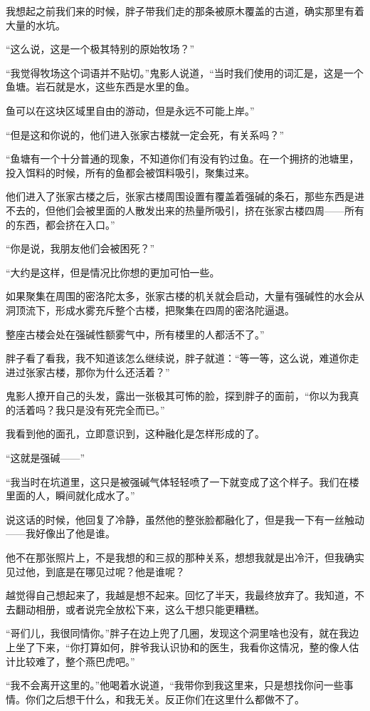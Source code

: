 我想起之前我们来的时候，胖子带我们走的那条被原木覆盖的古道，确实那里有着大量的水坑。

“这么说，这是一个极其特别的原始牧场？”

“我觉得牧场这个词语并不贴切。”鬼影人说道，“当时我们使用的词汇是，这是一个鱼塘。岩石就是水，这些东西是水里的鱼。

鱼可以在这块区域里自由的游动，但是永远不可能上岸。”

“但是这和你说的，他们进入张家古楼就一定会死，有关系吗？”

“鱼塘有一个十分普通的现象，不知道你们有没有钓过鱼。在一个拥挤的池塘里，投入饵料的时候，所有的鱼都会被饵料吸引，聚集过来。

他们进入了张家古楼之后，张家古楼周围设置有覆盖着强碱的条石，那些东西是进不去的，但他们会被里面的人散发出来的热量所吸引，挤在张家古楼四周——所有的东西，都会挤在入口。”

“你是说，我朋友他们会被困死？”

“大约是这样，但是情况比你想的更加可怕一些。

如果聚集在周围的密洛陀太多，张家古楼的机关就会启动，大量有强碱性的水会从洞顶流下，形成水雾充斥整个古楼，把聚集在四周的密洛陀逼退。

整座古楼会处在强碱性额雾气中，所有楼里的人都活不了。”

胖子看了看我，我不知道该怎么继续说，胖子就道：“等一等，这么说，难道你走进过张家古楼，那你为什么还活着？”

鬼影人撩开自己的头发，露出一张极其可怖的脸，探到胖子的面前，“你以为我真的活着吗？我只是没有死完全而已。”

我看到他的面孔，立即意识到，这种融化是怎样形成的了。

“这就是强碱——”

“我当时在坑道里，这只是被强碱气体轻轻喷了一下就变成了这个样子。我们在楼里面的人，瞬间就化成水了。”

说这话的时候，他回复了冷静，虽然他的整张脸都融化了，但是我一下有一丝触动——我好像出了他是谁。

他不在那张照片上，不是我想的和三叔的那种关系，想想我就是出冷汗，但我确实见过他，到底是在哪见过呢？他是谁呢？

越觉得自己想起来了，我越是想不起来。回忆了半天，我最终放弃了。我知道，不去翻动相册，或者说完全放松下来，这么干想只能更糟糕。

“哥们儿，我很同情你。”胖子在边上兜了几圈，发现这个洞里啥也没有，就在我边上坐了下来，“你打算如何，胖爷我认识协和的医生，我看你这情况，整的像人估计比较难了，整个燕巴虎吧。”

“我不会离开这里的。”他喝着水说道，“我带你到我这里来，只是想找你问一些事情。你们之后想干什么，和我无关。反正你们在这里什么都做不了。

